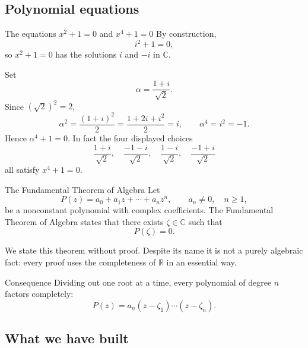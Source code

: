 \documentclass[aspectratio=169,11pt]{beamer}
\newcommand{\R}{\mathbb R}
\newcommand{\C}{\mathbb C}
\begin{document}
\subsection{Polynomial equations}

\begin{frame}{The equations \(x^2+1=0\) and \(x^4+1=0\)}
  By construction,
  \[
    i^2+1=0,
  \]
  so \(x^2+1=0\) has the solutions \(i\) and \(-i\) in \(\C\).

  Set
  \[
    \alpha=\frac{1+i}{\sqrt2}.
  \]
  Since \((\sqrt2)^2=2\),
  \[
    \alpha^2
      =\frac{(1+i)^2}{2}
      =\frac{1+2i+i^2}{2}
      =i,
    \qquad
    \alpha^4=i^2=-1.
  \]
  Hence \(\alpha^4+1=0\).  In fact the four displayed choices
  \[
    \boxed{\frac{1+i}{\sqrt2},\quad
      \frac{-1-i}{\sqrt2},\quad
      \frac{1-i}{\sqrt2},\quad
      \frac{-1+i}{\sqrt2}}
  \]
  all satisfy \(x^4+1=0\).
\end{frame}

\begin{frame}{The Fundamental Theorem of Algebra}
  Let
  \[
    P(z)=a_0+a_1z+\cdots+a_nz^n,
    \qquad
    a_n\ne0,
    \quad n\ge1,
  \]
  be a nonconstant polynomial with complex coefficients.  The Fundamental
  Theorem of Algebra states that there exists \(\zeta\in\C\) such that
  \[
    \boxed{P(\zeta)=0.}
  \]

  We state this theorem without proof.  Despite its name it is not a purely
  algebraic fact: every proof uses the completeness of \(\R\) in an
  essential way.

  \begin{block}{Consequence}
    Dividing out one root at a time, every polynomial of degree \(n\)
    factors completely:
    \[
      P(z)=a_n(z-\zeta_1)\cdots(z-\zeta_n).
    \]
  \end{block}
\end{frame}

\subsection{What we have built}
\end{document}
